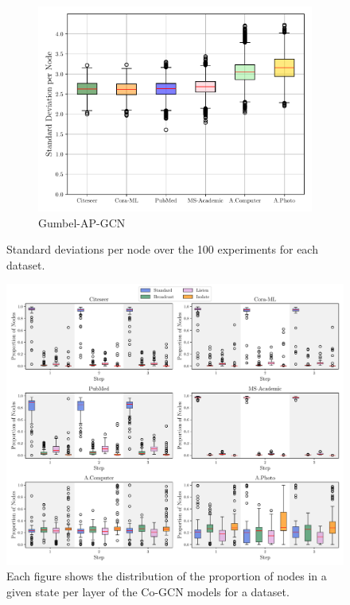 \documentclass{gdl}
\begin{document}
\begin{figure}[p]
\begin{minipage}[t]{0.48\textwidth}
        \begin{subfigure}[b]{0.8\textwidth}
            \centering
            \includegraphics[width=\textwidth]{Gumbel-AP-GCN_std_steps_per_node_boxplot.pdf}
            \captionsetup{justification=centerlast}
            \caption{Gumbel-AP-GCN}
            \label{fig:step_std_Gumbel_AP_GCN}
        \end{subfigure}

        
        \captionsetup{justification=centerlast}
        \caption{Standard deviations per node over the 100 experiments for each dataset.}
        \label{fig:steps-dist-steps-std}
    \end{minipage}
\end{figure}

\begin{figure}[p]
    \centering 
        \includegraphics[width=\textwidth]{Cooperative-AP-GCN_state_distribution_per_step.pdf}
        \caption{Each figure shows the distribution of the proportion of nodes in a given state per layer of the Co-GCN models for a dataset.}
        \label{fig:cooperative-result} 
\end{figure}
\end{document}
